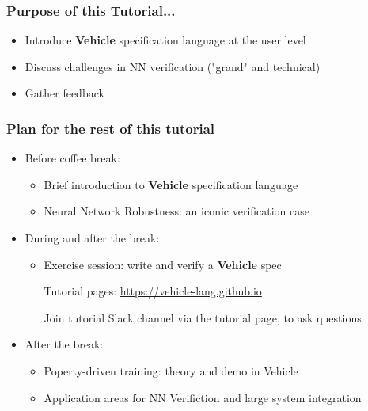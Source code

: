 \documentclass[aspectratio=169]{beamer}
\begin{document}
\begin{frame}
\frametitle{Purpose of this Tutorial...}

\begin{block}{}
\begin{itemize}
\item Introduce \textbf{Vehicle} specification language at the user level
\item Discuss challenges in NN verification ("grand" and technical)
\item Gather feedback
\end{itemize}
\end{block}

\end{frame}

\begin{frame}
\frametitle{Plan for the rest of this tutorial}

\begin{itemize}
\item Before coffee break:
\begin{itemize}
\item Brief introduction to \textbf{Vehicle} specification language
\item Neural Network Robustness: an iconic verification case


\end{itemize}

\item During and after the break:

\begin{itemize}

\item \alert{Exercise session:} write and verify a \textbf{Vehicle} spec

\footnotesize{Tutorial pages: \url{https://vehicle-lang.github.io}}


 Join tutorial Slack channel via the tutorial page, to ask questions

\end{itemize}

\item After the break:
\begin{itemize}



\item Poperty-driven training: theory and demo in Vehicle
\item Application areas for NN Verifiction and large system integration
\end{itemize}


\end{itemize}

\end{frame}
\end{document}
